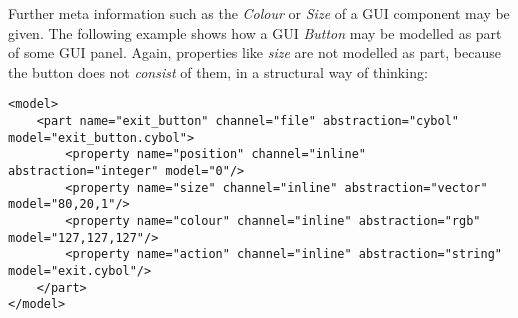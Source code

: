 Further meta information such as the \emph{Colour} or \emph{Size} of a GUI
component may be given. The following example shows how a GUI \emph{Button} may
be modelled as part of some GUI panel. Again, properties like \emph{size} are
not modelled as part, because the button does not \emph{consist} of them, in a
structural way of thinking:

\begin{scriptsize}
    \begin{verbatim}
<model>
    <part name="exit_button" channel="file" abstraction="cybol" model="exit_button.cybol">
        <property name="position" channel="inline" abstraction="integer" model="0"/>
        <property name="size" channel="inline" abstraction="vector" model="80,20,1"/>
        <property name="colour" channel="inline" abstraction="rgb" model="127,127,127"/>
        <property name="action" channel="inline" abstraction="string" model="exit.cybol"/>
    </part>
</model>
    \end{verbatim}
\end{scriptsize}
